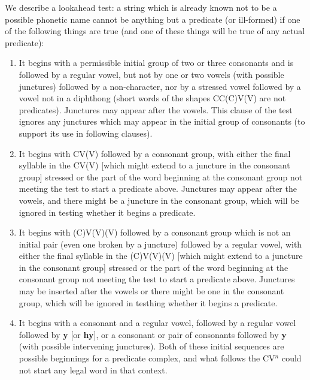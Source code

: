 \documentclass[12pt]{book}
\begin{document}
{We describe a  lookahead test:  a string which is already known not to be a possible phonetic name cannot be anything but a predicate (or ill-formed) if one of the following things are true (and one of these things will be true of any actual predicate):

\begin{enumerate}

\item  It begins with a permissible initial group of two or three consonants  and is followed by a regular vowel, but not by one or two vowels (with possible junctures) followed by a non-character, nor by a stressed vowel followed by a vowel not in a diphthong (short words of the shapes CC(C)V(V) are not predicates).  Junctures may appear after the vowels.  This clause of the test ignores any junctures which may appear in the initial group of consonants (to support its use in following clauses).

\item  It begins with CV(V) followed by a consonant group, with either the final syllable in the CV(V) [which might extend to a juncture in the consonant group] stressed or the part of the word beginning at the consonant group not meeting the test to start a predicate above.  Junctures may appear after the vowels, and there might be a juncture in the consonant group, which will be ignored in testing whether it begins a predicate.

\item  It begins with (C)V(V)(V) followed by a consonant group which is not an initial pair (even one broken by a juncture)  followed by a regular vowel, with either the final syllable in the (C)V(V)(V) [which might extend to a juncture in the consonant group]  stressed or the part of the word beginning at the consonant group not meeting the test to start a predicate above.  Junctures may be inserted after the vowels or there might be one in the consonant group, which will be ignored in testhing whether it begins a predicate.

\item It begins with a consonant and a regular vowel, followed by a regular vowel followed by {\bf y} [or {\bf hy}], or a consonant or pair of consonants followed by {\bf y} (with possible intervening junctures).  Both of these initial sequences
are possible beginnings for a predicate complex, and what follows the CV$^n$ could not start any legal word in that context.

\end{enumerate}

}
\end{document}
